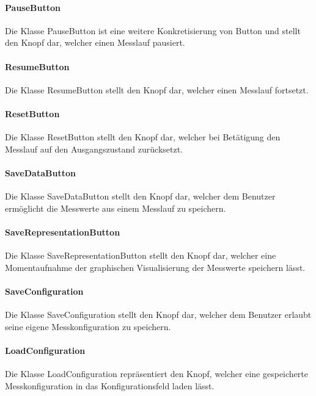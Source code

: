 \documentclass[parskip=full]{scrartcl}
\begin{document}
\paragraph{PauseButton}

Die Klasse PauseButton ist eine weitere Konkretisierung von Button und stellt den Knopf dar, welcher einen Messlauf pausiert.

\paragraph{ResumeButton}

Die Klasse ResumeButton stellt den Knopf dar, welcher einen Messlauf fortsetzt.

\paragraph{ResetButton}

Die Klasse ResetButton stellt den Knopf dar, welcher bei Betätigung den Messlauf auf den Ausgangszustand zurücksetzt.

\paragraph{SaveDataButton}

Die Klasse SaveDataButton stellt den Knopf dar, welcher dem Benutzer ermöglicht die Messwerte aus einem Messlauf zu speichern.

\paragraph{SaveRepresentationButton}

Die Klasse SaveRepresentationButton stellt den Knopf dar, welcher eine Momentaufnahme der graphischen Visualisierung der Messwerte speichern lässt.

\paragraph{SaveConfiguration}

Die Klasse SaveConfiguration stellt den Knopf dar, welcher dem Benutzer erlaubt seine eigene Messkonfiguration zu speichern.

\paragraph{LoadConfiguration} 

Die Klasse LoadConfiguration repräsentiert den Knopf, welcher eine gespeicherte Messkonfiguration in das Konfigurationsfeld laden lässt.
\end{document}
